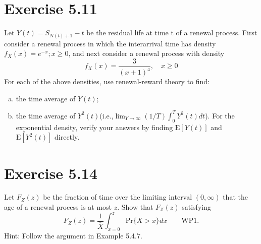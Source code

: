 \documentclass{article}
\begin{document}
    \section{Exercise 5.11}
    Let $Y(t)=S_{N(t)+1}-t$ be the residual life at time t of a renewal process. First consider a renewal process in which the interarrival time has density $f_X(x)=e^{-x};x\geq 0$, and next consider a renewal process with density
    \begin{equation*}
        f_X(x)=\frac{3}{(x+1)^4},\quad x\geq 0
    \end{equation*}
    For each of the above densities, use renewal-reward theory to find:
    \begin{enumerate}[(a)]
        \item the time average of $Y(t)$;
        \item the time average of $Y^2(t)$(i.e.,$\lim_{Y\rightarrow\infty}(1/T)\int^T_0Y^2(t)dt$). For the exponential density, verify your answers by finding $\text{E}[Y(t)]$ and $\text{E}[Y^2(t)]$ directly.
    \end{enumerate}

    \section{Exercise 5.14}
    Let $F_Z(z)$ be the fraction of time over the limiting interval $(0,\infty)$ that the age of a renewal process is at most $z$. Show that $F_Z(z)$ satisfying
    \begin{equation*}
        F_Z(z)=\frac{1}{\overline{X}}\int^z_{x=0}\text{Pr}\{X>x\}dx\qquad \text{WP1}.
    \end{equation*}
    Hint: Follow the argument in Example 5.4.7.
\end{document}
